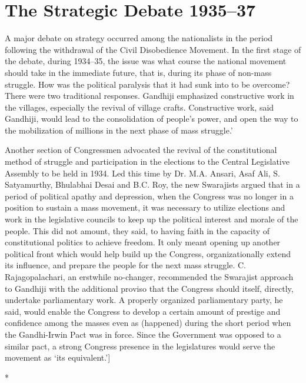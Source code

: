 \chapter{The Strategic Debate 1935--37}\label{chapter:CH25}

A major debate on strategy occurred among the nationalists in the period following the withdrawal of the Civil Disobedience Movement. In the first stage of the debate, during 1934--35, the issue was what course the national movement should take in the immediate future, that is, during its phase of non-mass struggle. How was the political paralysis that it had sunk into to be overcome? There were two traditional responses. Gandhiji emphasized constructive work in the villages, especially the revival of village crafts. Constructive work, said Gandhiji, would lead to the consolidation of people's power, and open the way to the mobilization of millions in the next phase of mass struggle.' 

Another section of Congressmen advocated the revival of the constitutional method of struggle and participation in the elections to the Central Legislative Assembly to be held in 1934. Led this time by Dr. M.A. Ansari, Asaf Ali, S. Satyamurthy, Bhulabhai Desai and B.C. Roy, the new Swarajists argued that in a period of political apathy and depression, when the Congress was no longer in a position to sustain a mass movement, it was necessary to utilize elections and work in the legislative councils to keep up the political interest and morale of the people. This did not amount, they said, to having faith in the capacity of constitutional politics to achieve freedom. It only meant opening up another political front which would help build up the Congress, organizationally extend its influence, and prepare the people for the next mass struggle. C. Rajagopalachari, an erstwhile no-changer, recommended the Swarajist approach to Gandhiji with the additional proviso that the Congress should itself, directly, undertake parliamentary work. A properly organized parliamentary party, he said, would enable the Congress to develop a certain amount of prestige and confidence among the masses even as (happened) during the short period when the Gandhi-Irwin Pact was in force. Since the Government was opposed to a similar pact, a strong Congress presence in the legislatures would serve the movement as `its equivalent.']

\begin{center}*\end{center}

